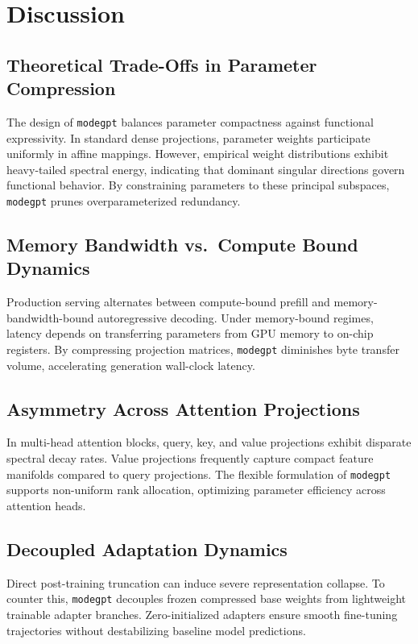 \section{Discussion}

\subsection{Theoretical Trade-Offs in Parameter Compression}
The design of \texttt{modegpt} balances parameter compactness against functional expressivity. In standard dense projections, parameter weights participate uniformly in affine mappings. However, empirical weight distributions exhibit heavy-tailed spectral energy, indicating that dominant singular directions govern functional behavior. By constraining parameters to these principal subspaces, \texttt{modegpt} prunes overparameterized redundancy.

\subsection{Memory Bandwidth vs.\ Compute Bound Dynamics}
Production serving alternates between compute-bound prefill and memory-bandwidth-bound autoregressive decoding. Under memory-bound regimes, latency depends on transferring parameters from GPU memory to on-chip registers. By compressing projection matrices, \texttt{modegpt} diminishes byte transfer volume, accelerating generation wall-clock latency.

\subsection{Asymmetry Across Attention Projections}
In multi-head attention blocks, query, key, and value projections exhibit disparate spectral decay rates. Value projections frequently capture compact feature manifolds compared to query projections. The flexible formulation of \texttt{modegpt} supports non-uniform rank allocation, optimizing parameter efficiency across attention heads.

\subsection{Decoupled Adaptation Dynamics}
Direct post-training truncation can induce severe representation collapse. To counter this, \texttt{modegpt} decouples frozen compressed base weights from lightweight trainable adapter branches. Zero-initialized adapters ensure smooth fine-tuning trajectories without destabilizing baseline model predictions.

